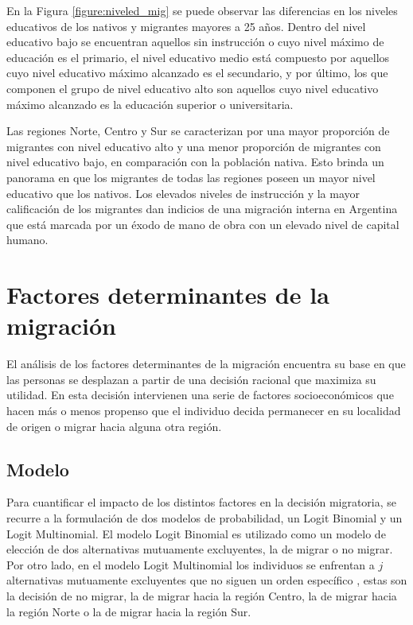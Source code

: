 \documentclass[12pt,a4paper]{article}
\begin{document}
En la Figura \ref{figure:niveled_mig} se puede observar las diferencias en los niveles educativos de los nativos y migrantes mayores a 25 años. Dentro del nivel educativo bajo se encuentran aquellos sin instrucción o cuyo nivel máximo de educación es el primario, el nivel educativo medio está compuesto por aquellos cuyo nivel educativo máximo alcanzado es el secundario, y por último, los que componen el grupo de nivel educativo alto son aquellos cuyo nivel educativo máximo alcanzado es la educación superior o universitaria.

Las regiones Norte, Centro y Sur se caracterizan por una mayor proporción de migrantes con nivel educativo alto y una menor proporción de migrantes con nivel educativo bajo, en comparación con la población nativa. Esto brinda un panorama en que los migrantes de todas las regiones poseen un mayor nivel educativo que los nativos. Los elevados niveles de instrucción y la mayor calificación de los migrantes dan indicios de una migración interna en Argentina que está marcada por un éxodo de mano de obra con un elevado nivel de capital humano.


\newpage
\section{Factores determinantes de la migración}
El análisis de los factores determinantes de la migración  encuentra su base en que las personas se desplazan a partir de una decisión racional que maximiza su utilidad. En esta decisión intervienen una serie de factores socioeconómicos que hacen más o menos propenso que el individuo decida permanecer en su localidad de origen o migrar hacia alguna otra región.
\subsection{Modelo}
Para cuantificar el impacto de los distintos factores en la decisión migratoria, se recurre a la formulación de dos modelos de probabilidad, un Logit Binomial y un Logit Multinomial. El modelo Logit Binomial es utilizado como un modelo de elección de dos alternativas mutuamente excluyentes, la de migrar o no migrar. Por otro lado, en el modelo Logit Multinomial los individuos se enfrentan a $j$ alternativas mutuamente excluyentes que no siguen un orden específico \parencite{greene_econometric_2018}, estas son la decisión de no migrar, la de migrar hacia la región Centro, la de migrar hacia la región Norte o la de migrar hacia la región Sur.
\end{document}
